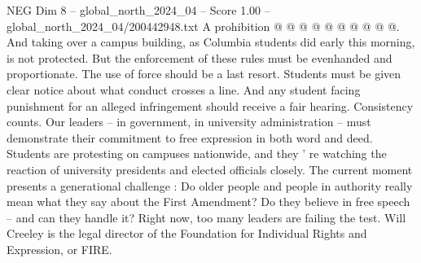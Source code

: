 \begin{textsample}{NEG Dim 8 – global\_north\_2024\_04 – Score 1.00 – global\_north\_2024\_04/200442948.txt}
A prohibition @ @ @ @ @ @ @ @ @ @.
And taking over a campus building, as Columbia students did early this morning, is not protected.
But the enforcement of these rules must be evenhanded and proportionate.
The use of force should be a last resort.
Students must be given clear notice about what conduct crosses a line.
And any student facing punishment for an alleged infringement should receive a fair hearing.
Consistency counts.
Our leaders -- in government, in university administration -- must demonstrate their commitment to free expression in both word and deed.
Students are protesting on campuses nationwide, and they ' re watching the reaction of university presidents and elected officials closely.
The current moment presents a generational challenge : Do older people and people in authority really mean what they say about the First Amendment?
Do they believe in free speech -- and can they handle it?
Right now, too many leaders are failing the test.
Will Creeley is the legal director of the Foundation for Individual Rights and Expression, or FIRE.

\end{textsample}
